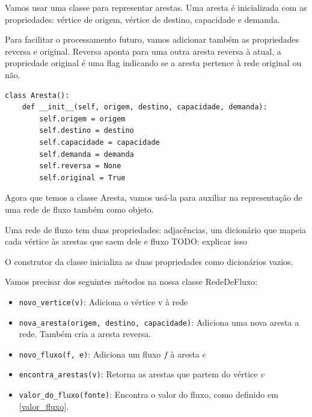 \documentclass[11pt]{article}
\begin{document}
Vamos usar uma classe para representar arestas. Uma aresta é
inicializada com as propriedades: vértice de origem, vértice de
destino, capacidade e demanda.

Para facilitar o processamento futuro, vamos adicionar também as
propriedades reversa e original. Reversa aponta para uma outra aresta
reversa à atual, a propriedade original é uma flag indicando se a
aresta pertence à rede original ou não.
\begin{verbatim}
class Aresta():
    def __init__(self, origem, destino, capacidade, demanda):
        self.origem = origem
        self.destino = destino
        self.capacidade = capacidade
        self.demanda = demanda
        self.reversa = None
        self.original = True
\end{verbatim}

Agora que temos a classe Aresta, vamos usá-la para auxiliar na
representação de uma rede de fluxo também como objeto.

Uma rede de fluxo tem duas propriedades: adjacências, um dicionário
que mapeia cada vértice às arestas que saem dele e fluxo TODO: explicar isso

O construtor da classe inicializa as duas propriedades como dicionários vazios.

Vamos precisar dos seguintes métodos na nossa classe RedeDeFluxo:

\begin{itemize}
\item \verb~novo_vertice(v)~: Adiciona o vértice v à rede
\item \verb~nova_aresta(origem, destino, capacidade)~: Adiciona uma nova aresta a
rede. Também cria a aresta reversa.
\item \verb~novo_fluxo(f, e)~: Adiciona um fluxo $f$ à aresta $e$
\item \verb~encontra_arestas(v)~: Retorna as arestas que partem do vértice $v$
\item \verb~valor_do_fluxo(fonte)~: Encontra o valor do fluxo, como definido em \eqref{valor_fluxo}.
\end{itemize}
\end{document}
